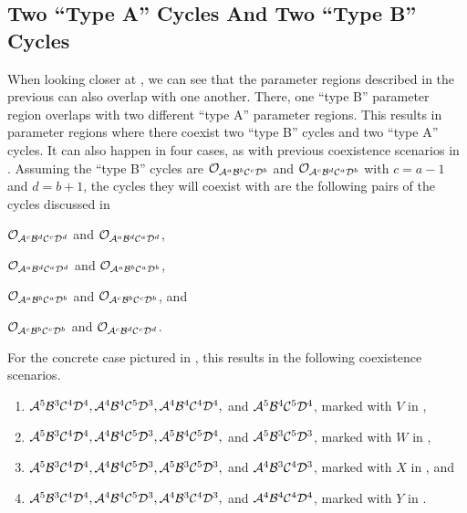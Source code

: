 \subsection{Two ``Type A'' Cycles And Two ``Type B'' Cycles}

When looking closer at , we can see that the parameter regions described in the previous  can also overlap with one another.
There, one ``type B'' parameter region overlaps with two different ``type A'' parameter regions.
This results in parameter regions where there coexist two ``type B'' cycles and two ``type A'' cycles.
It can also happen in four cases, as with previous coexistence scenarios in .
Assuming the ``type B'' cycles are $\Cycle{\A^a\B^b\C^c\D^b}$ and $\Cycle{\A^c\B^d\C^a\D^b}$ with $c = a - 1$ and $d = b + 1$, the cycles they will coexist with are the following pairs of the cycles discussed in 
\begin{enumerate*}
	\item $\Cycle{\A^c\B^d\C^c\D^d}$ and $\Cycle{\A^a\B^d\C^a\D^d}$,
	\item $\Cycle{\A^a\B^d\C^a\D^d}$ and $\Cycle{\A^a\B^b\C^a\D^b}$,
	\item $\Cycle{\A^a\B^b\C^a\D^b}$ and $\Cycle{\A^c\B^b\C^c\D^b}$, and
	\item $\Cycle{\A^c\B^b\C^c\D^b}$ and $\Cycle{\A^c\B^d\C^c\D^d}$.
\end{enumerate*}
For the concrete case pictured in , this results in the following coexistence scenarios.
\begin{enumerate}
	\item $\A^5\B^3\C^4\D^4, \A^4\B^4\C^5\D^3, \A^4\B^4\C^4\D^4,$ and $\A^5\B^4\C^5\D^4$, marked with $V$ in ,
	\item $\A^5\B^3\C^4\D^4, \A^4\B^4\C^5\D^3, \A^5\B^4\C^5\D^4,$ and $\A^5\B^3\C^5\D^3$, marked with $W$ in ,
	\item $\A^5\B^3\C^4\D^4, \A^4\B^4\C^5\D^3, \A^5\B^3\C^5\D^3,$ and $\A^4\B^3\C^4\D^3$, marked with $X$ in , and
	\item $\A^5\B^3\C^4\D^4, \A^4\B^4\C^5\D^3, \A^4\B^3\C^4\D^3,$ and $\A^4\B^4\C^4\D^4$, marked with $Y$ in .
\end{enumerate}

